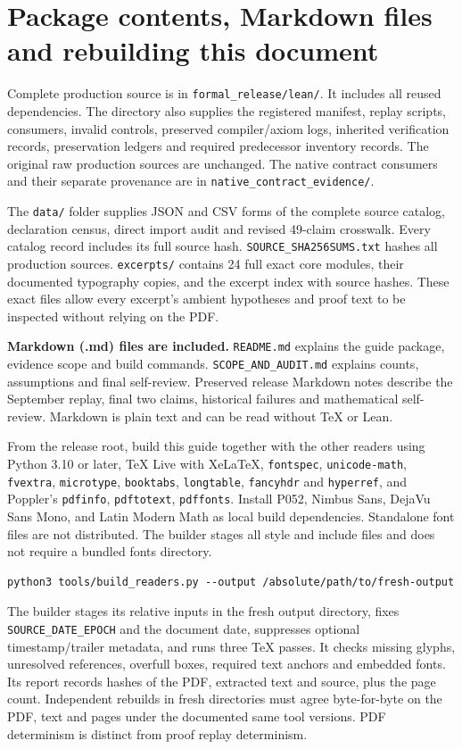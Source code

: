 \documentclass[11pt]{article}
\newcommand{\code}[1]{\nolinkurl{#1}}
\begin{document}
\section{Package contents, Markdown files and rebuilding this document}
Complete production source is in \code{formal_release/lean/}. It includes all reused dependencies. The directory also supplies the registered manifest, replay scripts, consumers, invalid controls, preserved compiler/axiom logs, inherited verification records, preservation ledgers and required predecessor inventory records. The original raw production sources are unchanged. The native contract consumers and their separate provenance are in \code{native_contract_evidence/}.

The \code{data/} folder supplies JSON and CSV forms of the complete source catalog, declaration census, direct import audit and revised 49-claim crosswalk. Every catalog record includes its full source hash. \code{SOURCE_SHA256SUMS.txt} hashes all production sources. \code{excerpts/} contains 24 full exact core modules, their documented typography copies, and the excerpt index with source hashes. These exact files allow every excerpt's ambient hypotheses and proof text to be inspected without relying on the PDF.

\textbf{Markdown (.md) files are included.} \code{README.md} explains the guide package, evidence scope and build commands. \code{SCOPE_AND_AUDIT.md} explains counts, assumptions and final self-review. Preserved release Markdown notes describe the September replay, final two claims, historical failures and mathematical self-review. Markdown is plain text and can be read without TeX or Lean.

From the release root, build this guide together with the other readers using Python 3.10 or later, TeX Live with XeLaTeX, \code{fontspec}, \code{unicode-math}, \code{fvextra}, \code{microtype}, \code{booktabs}, \code{longtable}, \code{fancyhdr} and \code{hyperref}, and Poppler's \code{pdfinfo}, \code{pdftotext}, \code{pdffonts}. Install P052, Nimbus Sans, DejaVu Sans Mono, and Latin Modern Math as local build dependencies. Standalone font files are not distributed. The builder stages all style and include files and does not require a bundled fonts directory.
\begin{Verbatim}[fontsize=\small,frame=lines]
python3 tools/build_readers.py --output /absolute/path/to/fresh-output
\end{Verbatim}
The builder stages its relative inputs in the fresh output directory, fixes \code{SOURCE_DATE_EPOCH} and the document date, suppresses optional timestamp/trailer metadata, and runs three TeX passes. It checks missing glyphs, unresolved references, overfull boxes, required text anchors and embedded fonts. Its report records hashes of the PDF, extracted text and source, plus the page count. Independent rebuilds in fresh directories must agree byte-for-byte on the PDF, text and pages under the documented same tool versions. PDF determinism is distinct from proof replay determinism.
\end{document}
